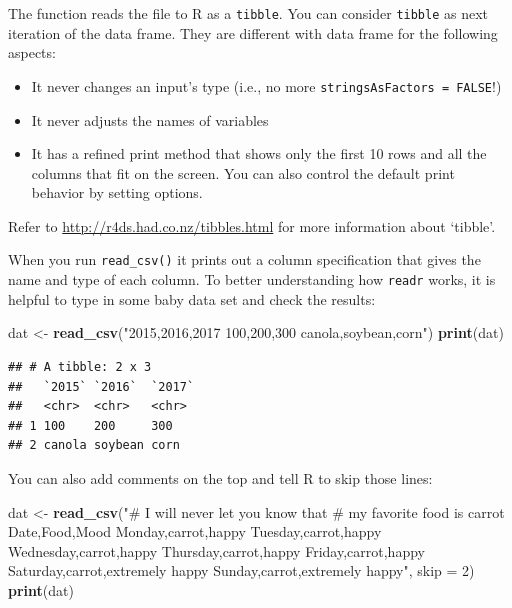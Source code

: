 \documentclass[12pt,]{krantz}
\makeatletter
\newenvironment{Shaded}{\begin{snugshade}}{\end{snugshade}}
\newcommand{\DataTypeTok}[1]{\textcolor[rgb]{0.27,0.27,0.27}{#1}}
\newcommand{\DecValTok}[1]{\textcolor[rgb]{0.06,0.06,0.06}{#1}}
\newcommand{\KeywordTok}[1]{\textcolor[rgb]{0.27,0.27,0.27}{\textbf{#1}}}
\newcommand{\NormalTok}[1]{#1}
\newcommand{\StringTok}[1]{\textcolor[rgb]{0.5,0.5,0.5}{#1}}
\providecommand{\tightlist}{%
  \setlength{\itemsep}{0pt}\setlength{\parskip}{0pt}}
\newenvironment{kframe}{%
\medskip{}
\setlength{\fboxsep}{.8em}
 \def\at@end@of@kframe{}%
 \ifinner\ifhmode%
  \def\at@end@of@kframe{\end{minipage}}%
  \begin{minipage}{\columnwidth}%
 \fi\fi%
 \def\FrameCommand##1{\hskip\@totalleftmargin \hskip-\fboxsep
 \colorbox{shadecolor}{##1}\hskip-\fboxsep
     \hskip-\linewidth \hskip-\@totalleftmargin \hskip\columnwidth}%
 \MakeFramed {\advance\hsize-\width
   \@totalleftmargin\z@ \linewidth\hsize
   \@setminipage}}%
 {\par\unskip\endMakeFramed%
 \at@end@of@kframe}
\renewenvironment{Shaded}{\begin{kframe}}{\end{kframe}}
\makeatother
\begin{document}
The function reads the file to R as a \texttt{tibble}. You can consider \texttt{tibble} as next iteration of the data frame. They are different with data frame for the following aspects:

\begin{itemize}
\tightlist
\item
  It never changes an input's type (i.e., no more \texttt{stringsAsFactors\ =\ FALSE}!)
\item
  It never adjusts the names of variables
\item
  It has a refined print method that shows only the first 10 rows and all the columns that fit on the screen. You can also control the default print behavior by setting options.
\end{itemize}

Refer to \url{http://r4ds.had.co.nz/tibbles.html} for more information about `tibble'.

When you run \texttt{read\_csv()} it prints out a column specification that gives the name and type of each column. To better understanding how \texttt{readr} works, it is helpful to type in some baby data set and check the results:

\begin{Shaded}
\begin{Highlighting}[]
\NormalTok{dat <-}\StringTok{ }\KeywordTok{read_csv}\NormalTok{(}\StringTok{"2015,2016,2017}
\StringTok{100,200,300}
\StringTok{canola,soybean,corn"}\NormalTok{)}
\KeywordTok{print}\NormalTok{(dat)}
\end{Highlighting}
\end{Shaded}

\begin{verbatim}
## # A tibble: 2 x 3
##   `2015` `2016`  `2017`
##   <chr>  <chr>   <chr> 
## 1 100    200     300   
## 2 canola soybean corn
\end{verbatim}

You can also add comments on the top and tell R to skip those lines:

\begin{Shaded}
\begin{Highlighting}[]
\NormalTok{dat <-}\StringTok{ }\KeywordTok{read_csv}\NormalTok{(}\StringTok{"# I will never let you know that}
\StringTok{          # my favorite food is carrot}
\StringTok{          Date,Food,Mood}
\StringTok{          Monday,carrot,happy}
\StringTok{          Tuesday,carrot,happy}
\StringTok{          Wednesday,carrot,happy}
\StringTok{          Thursday,carrot,happy}
\StringTok{          Friday,carrot,happy}
\StringTok{          Saturday,carrot,extremely happy}
\StringTok{          Sunday,carrot,extremely happy"}\NormalTok{, }
          \DataTypeTok{skip =} \DecValTok{2}\NormalTok{)}
\KeywordTok{print}\NormalTok{(dat)}
\end{Highlighting}
\end{Shaded}
\end{document}
